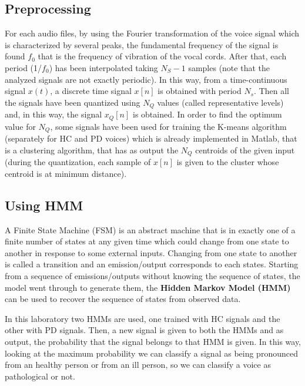 \documentclass[a4paper,12pt,oneside,titlepage]{article}
\begin{document}
	\subsection{Preprocessing}
	For each audio files, by using the Fourier transformation of the voice signal which is characterized by several peaks, the fundamental frequency of the signal is found $f_{0}$ that is the frequency of vibration of the vocal cords. After that, each period (1/$f_{0}$) has been interpolated taking $N_{S}-1$ samples (note that the analyzed signals are not exactly periodic). In this way, from a time-continuous signal  $x(t)$, a discrete time signal $x[n]$ is obtained with period $N_{s}$. Then all the signals have been quantized using $N_{Q}$ values (called representative levels) and, in this way, the signal  $x_{Q}[n]$ is obtained. In order to find the optimum value for $N_{Q}$, some signals have been used for training the K-means algorithm (separately for HC and PD voices) which is already implemented in Matlab, that is a clustering algorithm, that has as output the $N_{Q}$ centroids of the given input (during the quantization, each sample of $x[n]$ is given to the cluster whose centroid is at minimum distance).
	
	\subsection{Using HMM}
	A Finite State Machine (FSM) is an abstract machine that is in exactly one of a finite number of states at any given time which could change from one state to another in response to some external inputs. Changing from one state to another is called a transition and an emission/output corresponds to each states. Starting from a sequence of emissions/outputs without knowing the sequence of states, the model went through to generate them,  the \textbf{Hidden Markov Model (HMM)} can be used to recover the sequence of states from observed data.
	
	In this laboratory two HMMs are used, one trained with HC signals and the other with PD signals. Then, a new signal is given to both the HMMs and as output, the probability that the signal belongs to that HMM is given. In this way, looking at the maximum probability we can classify a signal as being pronounced from an healthy person or from an ill person, so we can classify a voice as pathological or not.
	
\end{document}
